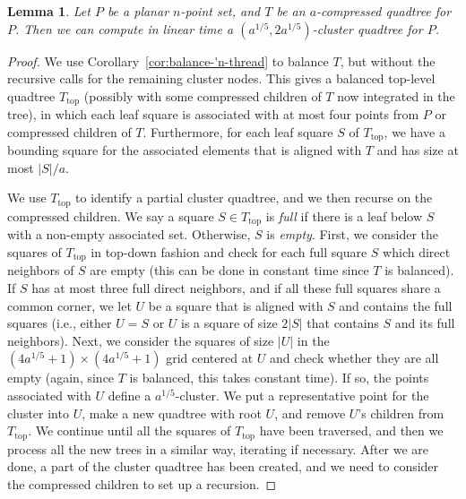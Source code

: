 \documentclass[11pt]{paper}
\newtheorem {lem}[theorem] {Lemma}
\begin{document}
    \begin{lem}\label{lem:compressed->c-cluster}
      Let $P$ be a planar $n$-point set, and $T$ be an $a$-compressed
      quadtree for $P$. Then we can compute in linear time a
      $(a^{1/5}, 2a^{1/5})$-cluster quadtree for $P$.
    \end{lem}

    \begin{proof} 
      We use 
      Corollary~\ref{cor:balance-'n-thread} to balance $T$, 
      but without the recursive calls for the remaining cluster
      nodes. This gives a balanced top-level quadtree $T_\text{top}$ 
      (possibly with some compressed children of $T$ now 
      integrated in the tree), in which each leaf square is  
      associated with at most four points from $P$ or compressed
      children of $T$. Furthermore, for each leaf square $S$ of $T_\text{top}$,
      we have a bounding square for the associated elements
      that is aligned with $T$ and has size at most 
      $|S|/a$. 

      We use $T_{\text{top}}$ to identify a partial 
      cluster quadtree, and we then recurse on the 
      compressed children.
      We say a square $S \in T_\text{top}$ is \emph{full} if 
      there is a leaf below $S$ with a non-empty associated set.
      Otherwise, $S$ is \emph{empty}.
      First, we consider the squares of $T_\text{top}$ in top-down
      fashion and check for each
      full square $S$ which direct neighbors of $S$ 
      are empty  (this can
      be done in constant time since $T$ is balanced). If $S$ has
      at most three full direct neighbors, and if all these
      full squares share a common corner,
      we let $U$ be a square that
      is aligned with $S$ and contains the full squares (i.e., either
      $U = S$ or $U$ is a square of size $2|S|$ that contains $S$ and
      its full neighbors). Next, we 
      consider the squares of size $|U|$ in
      the $(4a^{1/5}+1) \times (4a^{1/5}+1)$ grid centered at $U$
      and check whether they are all empty (again, since $T$ is balanced,
      this takes constant time).
      If so, the points associated with $U$
      define a $a^{1/5}$-cluster. We put a representative
      point for the cluster into $U$, make a new quadtree with root $U$,
      and remove $U$'s children from $T_\text{top}$.
      We continue until all the squares of $T_\text{top}$ have been traversed,
      and then we process all the new trees in a similar way, iterating
      if necessary. After we are done, a part of the cluster quadtree has
      been created, and we need to consider the compressed children
      to set up a recursion.


\end{proof}
\end{document}
